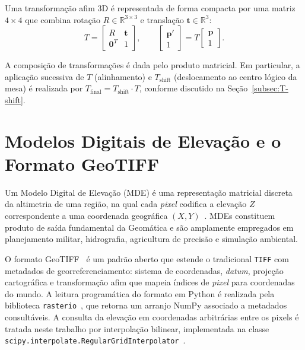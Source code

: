 Uma transformação afim 3D é representada de forma compacta por uma
matriz $4 \times 4$ que combina rotação $R \in \mathbb{R}^{3 \times 3}$ e
translação $\mathbf{t} \in \mathbb{R}^{3}$:
\begin{equation}
\label{eq:afim}
T = \begin{bmatrix} R & \mathbf{t} \\ \mathbf{0}^{T} & 1 \end{bmatrix},
\qquad
\begin{bmatrix} \mathbf{p}' \\ 1 \end{bmatrix}
= T \begin{bmatrix} \mathbf{p} \\ 1 \end{bmatrix}.
\end{equation}

A composição de transformações é dada pelo produto matricial. Em
particular, a aplicação sucessiva de $T$ (alinhamento) e $T_{\text{shift}}$
(deslocamento ao centro lógico da mesa) é realizada por
$T_{\text{final}} = T_{\text{shift}} \cdot T$, conforme
discutido na Seção~\ref{subsec:T-shift}.

\section{Modelos Digitais de Elevação e o Formato GeoTIFF}
\label{sec:mde}

Um Modelo Digital de Elevação (MDE) é uma representação
matricial discreta da altimetria de uma região, na qual cada \emph{pixel}
codifica a elevação $Z$ correspondente a uma coordenada geográfica
$(X, Y)$~\cite{li2005digital}. MDEs constituem produto de saída
fundamental da Geomática e são amplamente empregados em planejamento
militar, hidrografia, agricultura de precisão e simulação ambiental.

O formato GeoTIFF~\cite{geotiff} é um padrão aberto que
estende o tradicional \texttt{TIFF} com metadados de georreferenciamento:
sistema de coordenadas, \emph{datum}, projeção cartográfica e
transformação afim que mapeia índices de \emph{pixel} para coordenadas
do mundo. A leitura programática do formato em Python é realizada pela
biblioteca \texttt{rasterio}~\cite{rasterio}, que retorna um arranjo
NumPy associado a metadados consultáveis. A consulta da elevação em
coordenadas arbitrárias entre os pixels é tratada neste trabalho por
interpolação bilinear, implementada na classe
\texttt{scipy.interpolate.RegularGridInterpolator}~\cite{scipy}.
